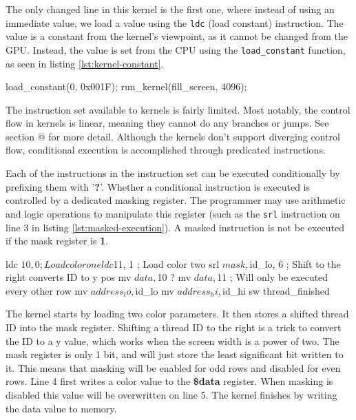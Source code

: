 \documentclass[../main/report.tex]{subfiles}
\begin{document}

The only changed line in this kernel is the first one,
where instead of using an immediate value, we load a value using the \verb/ldc/ (load constant) instruction.
The value is a constant from the kernel's viewpoint, as it cannot be changed from the GPU.
Instead, the value is set from the CPU using the \verb/load_constant/ function,
as seen in listing \ref{lst:kernel-constant}.

\begin{c-code}[caption=Now drawing a blue screen using parameters, label=lst:kernel-constant]
load_constant(0, 0x001F);
run_kernel(fill_screen, 4096);
\end{c-code}

The instruction set available to kernels is fairly limited.
Most notably, the control flow in kernels is linear, meaning they cannot do any branches or jumps. See section @ for more detail.
Although the kernels don't support diverging control flow,
conditional execution is accomplished through predicated instructions.

Each of the instructions in the instruction set can be executed conditionally by prefixing them with '\textbf{?}'.
Whether a conditional instruction is executed is controlled by a dedicated masking register.
The programmer may use arithmetic and logic operations to manipulate this register (such as the \verb/srl/ instruction on line 3 in listing \ref{lst:masked-execution}).
A masked instruction is not be executed if the mask register is \textbf{1}.

\begin{assembly}[caption=Conditional execution using predicated instructions, label=lst:masked-execution]
ldc $10, 0 ; Load color one
ldc $11, 1 ; Load color two
srl $mask, $id_lo, 6 ; Shift to the right converts ID to y pos
mv $data, $10 
? mv $data, $11 ; Will only be executed every other row
mv $address_lo, $id_lo
mv $address_hi, $id_hi
sw
thread_finished
\end{assembly}

The kernel starts by loading two color parameters.
It then stores a shifted thread ID into the mask register.
Shifting a thread ID to the right is a trick to convert the ID to a y value,
which works when the screen width is a power of two.
The mask register is only 1 bit, and will just store the least significant bit written to it.
This means that masking will be enabled for odd rows and disabled for even rows.
Line 4 first writes a color value to the \textbf{\$data} register.
When masking is disabled this value will be overwritten on line 5.
The kernel finishes by writing the data value to memory.
\end{document}
